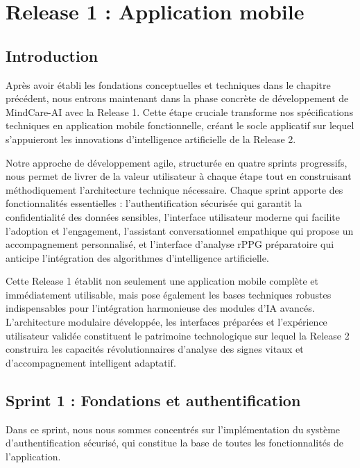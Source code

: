 \chapter{Release 1 : Application mobile}
\begingroup
{}
\localtableofcontents 
\endgroup
\newpage

\section{Introduction}
Après avoir établi les fondations conceptuelles et techniques dans le chapitre précédent, nous entrons maintenant dans la phase concrète de développement de MindCare-AI avec la Release 1. Cette étape cruciale transforme nos spécifications techniques en application mobile fonctionnelle, créant le socle applicatif sur lequel s'appuieront les innovations d'intelligence artificielle de la Release 2.

Notre approche de développement agile, structurée en quatre sprints progressifs, nous permet de livrer de la valeur utilisateur à chaque étape tout en construisant méthodiquement l'architecture technique nécessaire. Chaque sprint apporte des fonctionnalités essentielles : l'authentification sécurisée qui garantit la confidentialité des données sensibles, l'interface utilisateur moderne qui facilite l'adoption et l'engagement, l'assistant conversationnel empathique qui propose un accompagnement personnalisé, et l'interface d'analyse rPPG préparatoire qui anticipe l'intégration des algorithmes d'intelligence artificielle.

Cette Release 1 établit non seulement une application mobile complète et immédiatement utilisable, mais pose également les bases techniques robustes indispensables pour l'intégration harmonieuse des modules d'IA avancés. L'architecture modulaire développée, les interfaces préparées et l'expérience utilisateur validée constituent le patrimoine technologique sur lequel la Release 2 construira les capacités révolutionnaires d'analyse des signes vitaux et d'accompagnement intelligent adaptatif.

\section{Sprint 1 : Fondations et authentification}
Dans ce sprint, nous nous sommes concentrés sur l'implémentation du système d'authentification sécurisé, qui constitue la base de toutes les fonctionnalités de l'application.

